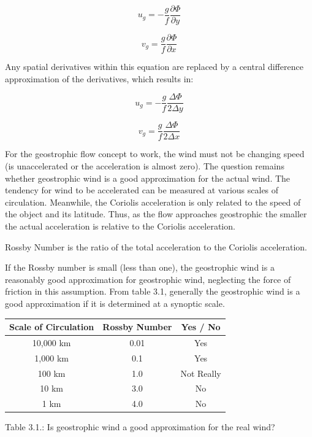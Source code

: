 \begin{equation}
    u_g = -\frac{g}{f} \frac{\partial \Phi}{\partial y}
    \label{u_g}
\end{equation}

\begin{equation}
    v_g = \frac{g}{f} \frac{\partial \Phi}{\partial x}
    \label{v_g}
\end{equation}

Any spatial derivatives within this equation are replaced by a central difference approximation of the derivatives, which results in:

\begin{equation}
    u_g = -\frac{g}{f} \frac{\Delta \Phi}{2 \Delta y}
\end{equation}

\begin{equation}
    v_g = \frac{g}{f} \frac{\Delta \Phi}{2 \Delta x}
\end{equation}

For the geostrophic flow concept to work, the wind must not be changing speed (is unaccelerated or the acceleration is almost zero). The question remains whether geostrophic wind is a good approximation for the actual wind. The tendency for wind to be accelerated can be measured at various scales of circulation. Meanwhile, the Coriolis acceleration is only related to the speed of the object and its latitude. Thus, as the flow  approaches geostrophic the smaller the actual acceleration is relative to the Coriolis acceleration\cite{geo_wind}.

\begin{definition}
Rossby Number is the ratio of the total acceleration to the Coriolis acceleration.
\end{definition}

If the Rossby number is small (less than one), the geostrophic wind is a reasonably good approximation for geostrophic wind, neglecting the force of friction in this assumption. From table 3.1, generally the geostrophic wind is a good approximation if it is determined at a synoptic scale\cite{geo_wind}. 

\hfill

\begin{center}
\begin{tabular}{|c|c|c|} 
 \hline
 Scale of Circulation & Rossby Number & Yes / No \\
 \hline
 10,000 km & 0.01 & Yes \\
 \hline
 1,000 km & 0.1 & Yes \\
 \hline
 100 km & 1.0 & Not Really \\
 \hline
 10 km & 3.0 & No \\
 \hline
 1 km & 4.0 & No \\
 \hline
\end{tabular}\par
\bigskip
Table 3.1.: Is geostrophic wind a good approximation for the real wind?
\end{center}

